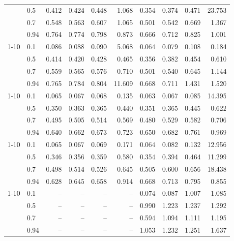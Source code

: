 \begin{tabular}{l|l|rrrr|rrrr}
 & 0.5 & 0.412 & 0.424 & 0.448 & 1.068 & 0.354 & 0.374 & 0.471 & 23.753 \\
 & 0.7 & 0.548 & 0.563 & 0.607 & 1.065 & 0.501 & 0.542 & 0.669 & 1.367 \\
 & 0.94 & 0.764 & 0.774 & 0.798 & 0.873 & 0.666 & 0.712 & 0.825 & 1.001 \\
\cmidrule{1-10}
\multirow[t]{4}{*}{IRQ steering removed} & 0.1 & 0.086 & 0.088 & 0.090 & 5.068 & 0.064 & 0.079 & 0.108 & 0.184 \\
 & 0.5 & 0.414 & 0.420 & 0.428 & 0.465 & 0.356 & 0.382 & 0.454 & 0.610 \\
 & 0.7 & 0.559 & 0.565 & 0.576 & 0.710 & 0.501 & 0.540 & 0.645 & 1.144 \\
 & 0.94 & 0.765 & 0.784 & 0.804 & 11.609 & 0.668 & 0.711 & 1.431 & 1.520 \\
\cmidrule{1-10}
\multirow[t]{4}{*}{boot-params bundle removed} & 0.1 & 0.065 & 0.067 & 0.068 & 0.135 & 0.063 & 0.067 & 0.085 & 14.395 \\
 & 0.5 & 0.350 & 0.363 & 0.365 & 0.440 & 0.351 & 0.365 & 0.445 & 0.622 \\
 & 0.7 & 0.495 & 0.505 & 0.514 & 0.569 & 0.480 & 0.529 & 0.582 & 0.706 \\
 & 0.94 & 0.640 & 0.662 & 0.673 & 0.723 & 0.650 & 0.682 & 0.761 & 0.969 \\
\cmidrule{1-10}
\multirow[t]{4}{*}{frequency pinning removed} & 0.1 & 0.065 & 0.067 & 0.069 & 0.171 & 0.064 & 0.082 & 0.132 & 12.956 \\
 & 0.5 & 0.346 & 0.356 & 0.359 & 0.580 & 0.354 & 0.394 & 0.464 & 11.299 \\
 & 0.7 & 0.498 & 0.514 & 0.526 & 0.645 & 0.505 & 0.600 & 0.656 & 18.438 \\
 & 0.94 & 0.628 & 0.645 & 0.658 & 0.914 & 0.668 & 0.713 & 0.795 & 0.855 \\
\cmidrule{1-10}
\multirow[t]{4}{*}{SMT enabled (multi-core)} & 0.1 & -- & -- & -- & -- & 0.074 & 0.087 & 1.007 & 1.085 \\
 & 0.5 & -- & -- & -- & -- & 0.990 & 1.223 & 1.237 & 1.292 \\
 & 0.7 & -- & -- & -- & -- & 0.594 & 1.094 & 1.111 & 1.195 \\
 & 0.94 & -- & -- & -- & -- & 1.053 & 1.232 & 1.251 & 1.637 \\
\bottomrule
\end{tabular}

